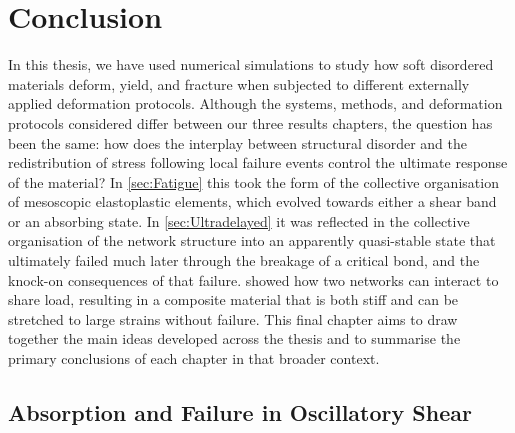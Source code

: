 
\setcounter{equation}{0}
\chapter{Conclusion}
In this thesis, we have used numerical simulations to study how soft disordered materials deform, yield, and fracture when subjected to different externally applied deformation protocols. Although the systems, methods, and deformation protocols considered differ between our three results chapters, the question has been the same: how does the interplay between structural disorder and the redistribution of stress following local failure events control the ultimate response of the material? In \cref{sec:Fatigue} this took the form of the collective organisation of mesoscopic elastoplastic elements, which evolved towards either a shear band or an absorbing state. In \cref{sec:Ultradelayed} it was reflected in the collective organisation of the network structure into an apparently quasi-stable state that ultimately failed much later through the breakage of a critical bond, and the knock-on consequences of that failure.  showed how two networks can interact to share load, resulting in a composite material that is both stiff and can be stretched to large strains without failure. This final chapter aims to draw together the main ideas developed across the thesis and to summarise the primary conclusions of each chapter in that broader context.

\section*{Absorption and Failure in Oscillatory Shear}


